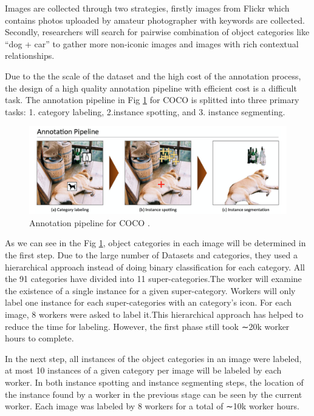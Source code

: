 \documentclass[
]{krantz}
\begin{document}
Images are collected through two strategies, firstly images from Flickr which contains photos uploaded by amateur photographer with keywords are collected. Secondly, researchers will search for pairwise combination of object categories like ``dog + car'' to gather more non-iconic images and images with rich contextual relationships.\citep{mccoco}

Due to the the scale of the dataset and the high cost of the annotation process, the design of a high quality annotation pipeline with efficient cost is a difficult task.
The annotation pipeline in Fig \ref{fig:cocoannotation} for COCO is splitted into three primary tasks: 1. category labeling, 2.instance spotting, and 3. instance segmenting.\citep{mccoco}

\begin{figure}

{\centering \includegraphics[width=1\linewidth]{figures/02-01/2.1 annotation pipeline} 

}

\caption{Annotation pipeline for COCO \citep{mccoco}.}\label{fig:cocoannotation}
\end{figure}



As we can see in the Fig \ref{fig:cocoannotation}, object categories in each image will be determined in the first step. Due to the large number of Datasets and categories, they used a hierarchical approach instead of doing binary classification for each category. All the 91 categories have divided into 11 super-categories.The worker will examine the existence of a single instance for a given super-category.
Workers will only label one instance for each super-categories with an category's icon.\citep{mccoco} For each image, 8 workers were asked to label it.This hierarchical approach has helped to reduce the time for labeling. However, the first phase still took ∼20k worker hours to complete.\citep{mccoco}

In the next step, all instances of the object categories in an image were labeled, at most 10 instances of a given category per image will be labeled by each worker. In both instance spotting and instance segmenting steps, the location of the instance found by a worker in the previous stage can be seen by the current worker. Each image was labeled by 8 workers for a total of ∼10k worker hours.\citep{mccoco}
\end{document}
